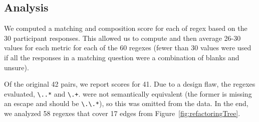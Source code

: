 \subsection{Analysis}
We computed a matching and composition score for each of regex based on the 30 participant responses. 
This allowed us to compute and then average 26-30 values for each metric  for each of the 60 regexes (fewer than 30 values were used if all the responses in a matching question were a combination of blanks and unsure). %


Of the original 42 pairs, we report scores for 41. Due to a design flaw, the regexes evaluated, \verb!\..*! and \verb!\.+!. were not semantically equivalent (the former is missing an escape and should be \verb!\.\.*!), so this was omitted from the data. In the end, we analyzed 58 regexes that cover  17 edges from Figure~\ref{fig:refactoringTree}.

